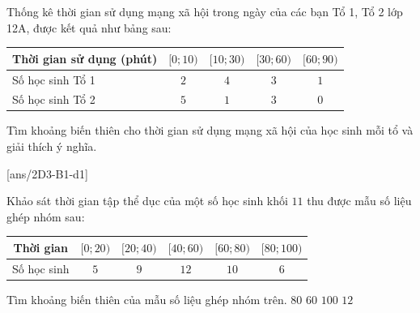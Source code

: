 \begin{vd}
	Thống kê thời gian sử dụng mạng xã hội trong ngày của các bạn Tổ 1, Tổ 2 lớp 12A, được kết quả như bảng sau:
	\begin{center}
		\begin{tabular}{|l|c|c|c|c|}
			\hline Thời gian sử dụng (phút) &{$[0; 10)$} &{$[10; 30)$} &{$[30; 60)$} &{$[60; 90)$} \\
			\hline Số học sinh Tổ 1 & $ 2 $ & $ 4 $ & $ 3 $ & $ 1 $ \\
			\hline Số học sinh Tổ 2 & $ 5 $ & $ 1 $ & $ 3 $ & $ 0 $ \\
			\hline
		\end{tabular}
	\end{center}
	Tìm khoảng biến thiên cho thời gian sử dụng mạng xã hội của học sinh mỗi tổ và giải thích ý nghĩa.
\end{vd}
\baitaptn
[ans/2D3-B1-d1]
\begin{ex}
	Khảo sát thời gian tập thể dục của một số học sinh khối $11$ thu được mẫu số liệu ghép nhóm sau:
	\vspace*{-10pt}
	\begin{center}
		\begin{tabular}{|c|c|c|c|c|c|}
			\hline Thời gian & {$[0 ; 20)$} & {$[20 ; 40)$} & {$[40 ; 60)$} & {$[60 ; 80)$} &  {$[80 ;100)$} \\
			\hline Số học sinh & $5$ & $9$ & $12$ & $10$ & $6$  \\
			\hline
		\end{tabular}
	\end{center}
	Tìm khoảng biến thiên của mẫu số liệu ghép nhóm trên.
	\choice
	{$80$}
	{$60$}
	{\True $100$}
	{$12$}
\end{ex}

